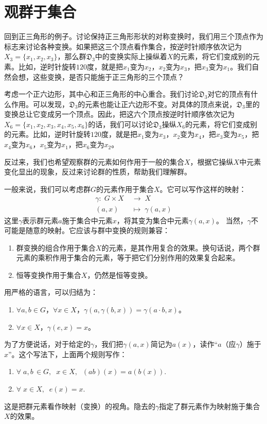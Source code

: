 \documentclass[12pt,UTF8,fontset=none]{ctexbook}
\begin{document}
\section{观群于集合}   %

回到正三角形的例子。讨论保持正三角形形状的对称变换时，我们用三个顶点作为标志来讨论各种变换。如果把这三个顶点看作集合，按逆时针顺序依次记为$X_3 = \{x_1, x_2, x_3\}$，那么群$\mathfrak{D}_3$中的变换实际上操纵着$X$的元素，将它们变成别的元素。比如，逆时针旋转$120$度，就是把$x_1$变为$x_2$，$x_2$变为$x_3$，把$x_3$变为$x_1$。我们自然会想，这些变换，是否只能施于正三角形的三个顶点？

考虑一个正六边形，其中心和正三角形的中心重合。我们讨论$\mathfrak{D}_3$对它的顶点有什么作用。可以发现，$\mathfrak{D}_3$的元素也能让正六边形不变。对具体的顶点来说，$\mathfrak{D}_3$里的变换总让它变成另一个顶点。因此，把这六个顶点按逆时针顺序依次记为$X_6 = \{x_1, x_2, x_3, x_4, x_5, x_6\}$的话，我们可以讨论$\mathfrak{D}_3$操纵$X_6$的元素，将它们变成别的元素。比如，逆时针旋转$120$度，就是把$x_1$变为$x_3$，$x_2$变为$x_4$，把$x_3$变为$x_5$，把$x_4$变为$x_6$，$x_5$变为$x_1$，把$x_6$变为$x_2$。

反过来，我们也希望观察群的元素如何作用于一般的集合$X$，根据它操纵$X$中元素变化显出的现象，反过来讨论群的性质，帮助我们理解群。

一般来说，我们可以考虑群$G$的元素作用于集合$X$。它可以写作这样的映射：
\begin{align*}
    \gamma:\; G\times X\;&\longrightarrow \; X\\
    (a, x)\;&\longmapsto\; \gamma(a,x)
\end{align*}
这里$\gamma$表示群元素$a$施于集合中元素$x$，将其变为集合中元素$\gamma(a,x)$。
当然，$\gamma$不可能是随意的映射。它应该与群中变换的规则兼容：
\begin{enumerate}[label=\arabic*.]
    \item 群变换的组合作用于集合$X$的元素，是其作用复合的效果。换句话说，两个群元素的乘积作用于集合的元素，等于把它们分别作用的效果复合起来。
    \item 恒等变换作用于集合$X$，仍然是恒等变换。
\end{enumerate}
用严格的语言，可以归结为：
\begin{enumerate}
    \item $\forall a, b\in G$，$\forall x\in X$，$\gamma(a,\gamma(b,x)) = \gamma(a\cdot b, x) $。
    \item $\forall x\in X$，$\gamma (e, x) = x$。
\end{enumerate}
为了方便说话，对于给定的$\gamma$，我们把$\gamma(a,x)$简记为$a(x)$，读作“$a$（应$\gamma$）施于$x$”。这个写法下，上面两个规则写作：
\begin{enumerate}
    \item $\forall \;a,b\,\in G,\;\;x\in X,\;\; (ab)(x) = a(b(x)).$
    \item $\forall\;x\in X,\;\;e(x) = x.$
\end{enumerate}
这是把群元素看作映射（变换）的视角。隐去的$\gamma$指定了群元素作为映射施于集合$X$的效果。
\end{document}
